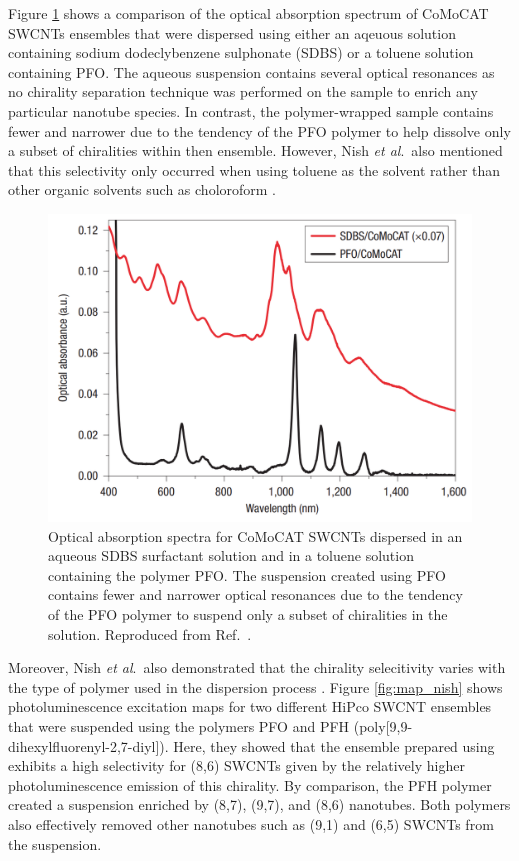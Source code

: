 Figure \ref{fig:comparison_nish} shows a comparison of the optical absorption spectrum of CoMoCAT SWCNTs ensembles that were dispersed using either an aqeuous solution containing sodium dodeclybenzene sulphonate (SDBS) or a toluene solution containing PFO. The aqueous suspension contains several optical resonances as no chirality separation technique was performed on the sample to enrich any particular nanotube species. In contrast, the polymer-wrapped sample contains fewer and narrower due to the tendency of the PFO polymer to help dissolve only a subset of chiralities within then ensemble. However, Nish \textit{et al}.\ also mentioned that this selectivity only occurred when using toluene as the solvent rather than other organic solvents such as choloroform \cite{nish2007highly}.

\begin{figure}[H]
	\centering
	\includegraphics[scale=1.4]{images/chapter_methods/purification_nish_2}
	\caption{Optical absorption spectra for CoMoCAT SWCNTs dispersed in an aqueous SDBS surfactant solution and in a toluene solution containing the polymer PFO. The suspension created using PFO contains fewer and narrower optical resonances due to the tendency of the PFO polymer to suspend only a subset of chiralities in the solution. Reproduced from Ref.\ \cite{nish2007highly}. }
	\label{fig:comparison_nish}
\end{figure}


Moreover, Nish \textit{et al}.\ also demonstrated that the chirality selecitivity varies with the type of polymer used in the dispersion process \cite{nish2007highly}. Figure \ref{fig:map_nish} shows photoluminescence excitation maps for two different HiPco SWCNT ensembles that were suspended using the polymers PFO and PFH (poly[9,9-dihexylfluorenyl-2,7-diyl]). Here, they showed that the ensemble prepared using exhibits a high selectivity for (8,6) SWCNTs given by the relatively higher photoluminescence emission of this chirality. By comparison, the PFH polymer created a suspension enriched by (8,7), (9,7), and (8,6) nanotubes. Both polymers also effectively removed other nanotubes such as (9,1) and (6,5) SWCNTs from the suspension.

